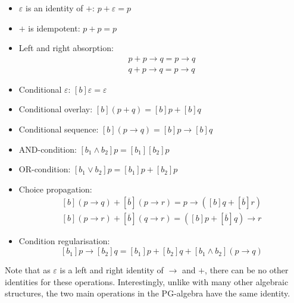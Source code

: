 \begin{itemize}
\item $\varepsilon$ is an identity of $+$: $p+\varepsilon=p$
\item $+$ is idempotent: $p+p=p$
\item Left and right absorption:\vspace{-0.3em}
\[
\begin{array}{c}
p+p\rightarrow q=p\rightarrow q\\
q+p\rightarrow q=p\rightarrow q
\end{array}
\]

\item Conditional $\varepsilon$: $[b]\varepsilon=\varepsilon$
\item Conditional overlay: $[b](p+q)=[b]p+[b]q$
\item Conditional sequence: $[b](p\rightarrow q)=[b]p\rightarrow[b]q$
\item AND-condition: $[b_{1}\wedge b_{2}]p=[b_{1}][b_{2}]p$
\item OR-condition: $[b_{1}\vee b_{2}]p=[b_{1}]p+[b_{2}]p$
\item Choice propagation:\vspace{-0.3em}
\[
\begin{array}{c}
[b](p\rightarrow q)+[\overline{b}](p\rightarrow r)=p\rightarrow([b]q+[\overline{b}]r)\\
{}[b](p\rightarrow r)+[\overline{b}](q\rightarrow r)=([b]p+[\overline{b}]q)\rightarrow r
\end{array}
\]

\item Condition regularisation:\vspace{-0.3em}
\[
[b_{1}]p\rightarrow[b_{2}]q=[b_{1}]p+[b_{2}]q+[b_{1}\wedge b_{2}](p\rightarrow q)
\]

\end{itemize}
Note that as $\varepsilon$ is a left and right identity of $\rightarrow$
and $+$, there can be no other identities for these operations. Interestingly,
unlike with many other algebraic structures, the two main operations in the PG-algebra
have the same identity.

